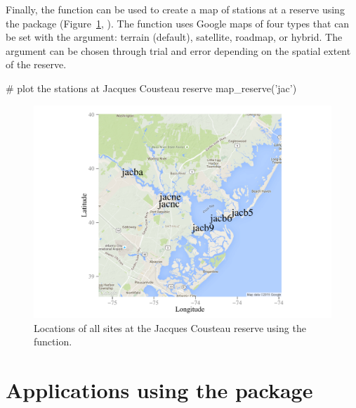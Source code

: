 Finally, the  function can be used to create a map of stations at a reserve using the  package (Figure~\ref{fig:map_ex}, \citet{Kahle13}). The function uses Google maps of four types that can be set with the  argument: terrain (default), satellite, roadmap, or hybrid.  The  argument can be chosen through trial and error depending on the spatial extent of the reserve.

\begin{example}
# plot the stations at Jacques Cousteau reserve
map_reserve('jac')
\end{example}

\begin{figure}[!h]

{\centering \includegraphics[width=\textwidth]{map_ex-1} 

}

\caption[Locations of all sites at the Jacques Cousteau reserve using the  function]{Locations of all sites at the Jacques Cousteau reserve using the  function.}\label{fig:map_ex}
\end{figure}

\section{Applications using the  package}
\label{swmp_apps}

